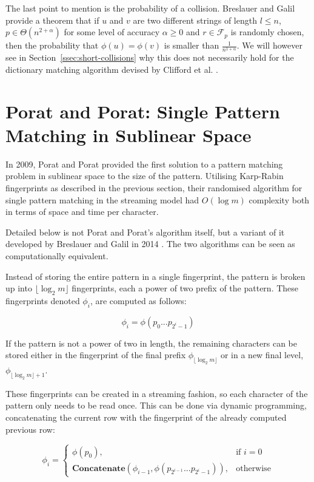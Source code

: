\documentclass[ %
                    author={Dominic Joseph Moylett},
                    degree={MEng},
                     title={Dictionary Matching with Fingerprints},
                  subtitle={An Empirical Analysis},
                      type={research},
                      year={2015} ]{dissertation}
\begin{document}
The last point to mention is the probability of a collision. Breslauer and Galil \cite{Breslauer:2014:RSS:2660854.2635814} provide a theorem that if $u$ and $v$ are two different strings of length $l \leq n$, $p \in \Theta(n^{2 + \alpha})$ for some level of accuracy $\alpha \geq 0$ and $r \in \mathcal{F}_p$ is randomly chosen, then the probability that $\phi(u) = \phi(v)$ is smaller than $\frac{1}{n^{1 + \alpha}}$. We will however see in Section~\ref{ssec:short-collisions} why this does not necessarily hold for the dictionary matching algorithm devised by Clifford et al. \cite{2015arXiv150406242C}.

\section{Porat and Porat: Single Pattern Matching in Sublinear Space}
\label{sec:porat-porat}

In 2009, Porat and Porat \cite{5438620} provided the first solution to a pattern matching problem in sublinear space to the size of the pattern. Utilising Karp-Rabin fingerprints as described in the previous section, their randomised algorithm for single pattern matching in the streaming model had $O(\log m)$ complexity both in terms of space and time per character.

Detailed below is not Porat and Porat's algorithm itself, but a variant of it developed by Breslauer and Galil in 2014 \cite{Breslauer:2014:RSS:2660854.2635814}. The two algorithms can be seen as computationally equivalent.

Instead of storing the entire pattern in a single fingerprint, the pattern is broken up into $\lfloor \log_2 m\rfloor$ fingerprints, each a power of two prefix of the pattern. These fingerprints denoted $\phi_i$, are computed as follows:

$$\phi_i = \phi(p_0...p_{2^i-1})$$

If the pattern is not a power of two in length, the remaining characters can be stored either in the fingerprint of the final prefix $\phi_{\lfloor\log_2m\rfloor}$ or in a new final level, $\phi_{\lfloor\log_2m\rfloor + 1}$.

These fingerprints can be created in a streaming fashion, so each character of the pattern only needs to be read once. This can be done via dynamic programming, concatenating the current row with the fingerprint of the already computed previous row:

\[
  \phi_i =
  \begin{cases}
    \phi(p_0),& \text{if } i = 0\\
    \textbf{Concatenate}(\phi_{i - 1}, \phi(p_{2^{i-1}}...p_{2^i-1})),& \text{otherwise}
  \end{cases}
\]
\end{document}
